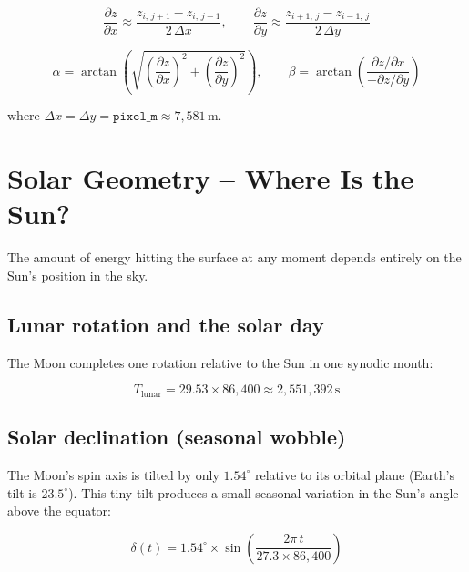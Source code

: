 \documentclass[12pt, a4paper]{article}
\begin{document}
\begin{equation}
  \frac{\partial z}{\partial x}
    \approx \frac{z_{i,\,j+1}-z_{i,\,j-1}}{2\,\Delta x},
  \qquad
  \frac{\partial z}{\partial y}
    \approx \frac{z_{i+1,\,j}-z_{i-1,\,j}}{2\,\Delta y}
  \label{eq:gradient}
\end{equation}

\begin{equation}
  \alpha = \arctan\!\left(
    \sqrt{\left(\frac{\partial z}{\partial x}\right)^2 +
          \left(\frac{\partial z}{\partial y}\right)^2}
  \right),
  \qquad
  \beta  = \arctan\!\left(
    \frac{\partial z/\partial x}{-\partial z/\partial y}
  \right)
  \label{eq:slope_aspect}
\end{equation}

where $\Delta x = \Delta y = \texttt{pixel\_m} \approx 7{,}581$\,m.

\section{Solar Geometry -- Where Is the Sun?}

The amount of energy hitting the surface at any moment depends
entirely on the Sun's position in the sky.

\subsection{Lunar rotation and the solar day}

The Moon completes one rotation relative to the Sun in one synodic
month:

\begin{equation}
  T_{\text{lunar}} = 29.53 \times 86{,}400
                   \approx 2{,}551{,}392\,\text{s}
  \label{eq:lunar_day}
\end{equation}

\subsection{Solar declination (seasonal wobble)}

The Moon's spin axis is tilted by only $1.54^{\circ}$ relative to
its orbital plane (Earth's tilt is $23.5^{\circ}$).
This tiny tilt produces a small seasonal variation in the Sun's
angle above the equator:

\begin{equation}
  \delta(t) = 1.54^{\circ} \times
  \sin\!\left(\frac{2\pi\,t}{27.3 \times 86{,}400}\right)
  \label{eq:declination}
\end{equation}
\end{document}
